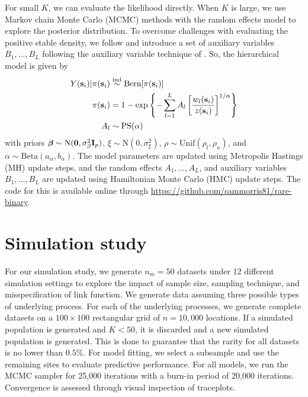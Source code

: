 For small $K$, we can evaluate the likelihood directly.
When $K$ is large, we use Markov chain Monte Carlo (MCMC) methods with the random effects model to explore the posterior distribution.
To overcome challenges with evaluating the positive stable density, we follow \citet{Reich2012} and introduce a set of auxiliary variables $B_1, \ldots, B_L$ following the auxiliary variable technique of \citet{Stephenson2009} \citep[see Appendix A.3]{Reich2012}.
So, the hierarchical model is given by
\begin{align}
Y(\mathbf{s}_i) | \pi(\mathbf{s}_i) &\stackrel{\mathrm{ind}}{\sim} \text{Bern}[\pi(\mathbf{s}_i)] \\
\pi(\mathbf{s}_i) &= 1 - \exp \left\{ -\displaystyle \sum_{ l = 1 }^{L} A_l \left[ \frac{ w_{l}(\mathbf{s}_i) }{ z(\mathbf{s}_i) } \right]^{ 1/\alpha} \right\} \nonumber\\
A_l &\sim \text{PS}(\alpha) \nonumber
\end{align}
with priors $\mbox{\boldmath $\beta$} \sim \text{N}(\mathbf{0}, \sigma^2_\beta \mathbf{I}_p )$, $\xi \sim \text{N}(0, \sigma^2_\xi)$, $\rho \sim \text{Unif}(\rho_l, \rho_u)$, and $\alpha \sim \text{Beta}(a_\alpha, b_\alpha)$.
The model parameters are updated using Metropolis Hastings (MH) update steps, and the random effects $A_1, \ldots, A_L$, and auxiliary variables $B_1, \ldots, B_L$ are updated using Hamiltonian Monte Carlo (HMC) update steps.
The code for this is available online through \url{https://github.com/sammorris81/rare-binary}.

\section{Simulation study}\label{rbs:sim}

For our simulation study, we generate $n_m = 50$ datasets under 12 different simulation settings to explore the impact of sample size, sampling technique, and misspecification of link function.
We generate data assuming three possible types of underlying process.
For each of the underlying processes, we generate complete datasets on a $100 \times 100$ rectangular grid of $n = 10,000$ locations.
If a simulated population is generated and $K < 50$, it is discarded and a new simulated population is generated.
This is done to guarantee that the rarity for all datasets is no lower than $0.5\%$.
For model fitting, we select a subsample and use the remaining sites to evaluate predictive performance.
For all models, we run the MCMC sampler for 25,000 iterations with a burn-in period of 20,000 iterations.
Convergence is assessed through visual inspection of traceplots.

